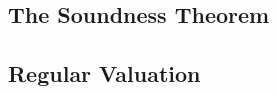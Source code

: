 \documentclass{report}
\begin{document}
    \subsection{The Soundness Theorem}
      
    \subsection{Regular Valuation}
      
%      
\end{document}

